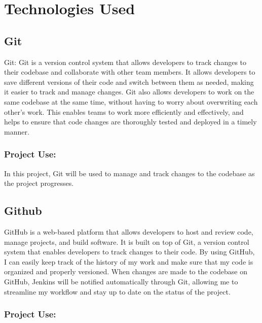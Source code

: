\documentclass[
  10pt,
  paper=a4,
  ,captions=tableheading
]{scrartcl}
\begin{document}
\hypertarget{technologies-used}{%
\section{Technologies Used}\label{technologies-used}}

\hypertarget{git}{%
\subsection{Git}\label{git}}

Git: Git is a version control system that allows developers to track
changes to their codebase and collaborate with other team members. It
allows developers to save different versions of their code and switch
between them as needed, making it easier to track and manage changes.
Git also allows developers to work on the same codebase at the same
time, without having to worry about overwriting each other's work. This
enables teams to work more efficiently and effectively, and helps to
ensure that code changes are thoroughly tested and deployed in a timely
manner.

\hypertarget{project-use}{%
\subsubsection{Project Use:}\label{project-use}}

In this project, Git will be used to manage and track changes to the
codebase as the project progresses.

\hypertarget{github}{%
\subsection{Github}\label{github}}

GitHub is a web-based platform that allows developers to host and review
code, manage projects, and build software. It is built on top of Git, a
version control system that enables developers to track changes to their
code. By using GitHub, I can easily keep track of the history of my work
and make sure that my code is organized and properly versioned. When
changes are made to the codebase on GitHub, Jenkins will be notified
automatically through Git, allowing me to streamline my workflow and
stay up to date on the status of the project.

\hypertarget{project-use-1}{%
\subsubsection{Project Use:}\label{project-use-1}}
\end{document}
